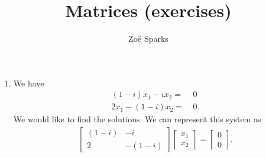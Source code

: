 \documentclass[12pt]{article}
\title{Matrices (exercises)}
\author{Zoë Sparks}
\begin{document}
\theoremstyle{definition}

\newtheorem{thm}{Theorem}
\newtheorem*{nthm}{Theorem}
\newtheorem{sthm}{}[thm]
\newtheorem{lemma}{Lemma}[thm]
\newtheorem{cor}{Corollary}[thm]
\newtheorem*{prop}{Property}
\newtheorem*{defn}{Definition}
\newtheorem*{comm}{Comment}
\newtheorem*{exm}{Example}

\maketitle

\begin{enumerate}
    \item
      We have
      \begin{align*}
        (1 - i)x_1 - ix_2 = &\ 0\\
        2x_1 - (1 - i)x_2 = &\ 0.
      \end{align*}
      We would like to find the solutions. We can represent this
      system as
      \begin{align*}
        \begin{bmatrix}
          (1 - i) & -i \\
          2       & -(1 - i)
        \end{bmatrix}
        \begin{bmatrix}
          x_1 \\
          x_2
        \end{bmatrix}
        =
        \begin{bmatrix}
          0 \\
          0
        \end{bmatrix}.
      \end{align*}


\end{enumerate}
\end{document}
